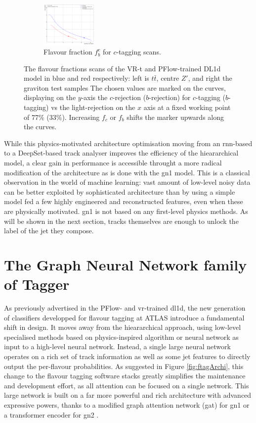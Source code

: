 \begin{figure}[h!]
\begin{subfigure}[b]{0.98\textwidth}
    \includegraphics[width=0.3\textwidth]{Images/FTAG/VRDL1d/scansfraction/thesis_plot_frac_c/contour_fraction_graviton_2000.pdf}
    \caption{Flavour fraction $f_b^c$ for $c$-tagging scans.} 
    \label{fig:DL1dVRscanfc}
\end{subfigure}
  \caption{The flavour fractions scans of the VR-t and PFlow-trained DL1d model in blue and red respectively: left is $t\bar{t}$, centre $Z'$, and right the graviton test samples The chosen values are marked on the curves, displaying on the $y$-axis the $c$-rejection ($b$-rejection) for $c$-tagging ($b$-tagging) vs the light-rejection on the $x$ axis at a fixed working point of 77\% (33\%). Increasing $f_c$ or $f_b$ shifts the marker upwards along the curves. }
  \label{fig:DL1dVRscanf}
\end{figure} 

While this physics-motivated architecture optimisation moving from an \gls{rnn}-based to a DeepSet-based track analyser improves the efficiency of the hieararchical model, a clear gain in performance is accessible throught a more radical modification of the architecture as is done with the \gls{gn1} model. This is a classical observation in the world of machine learning: vast amount of low-level noisy data can be better exploited by sophisticated architecture than by using a simple model fed a few highly engineered and reconstructed features, even when these are physically motivated. \gls{gn1} is not based on any first-level physics methods. As will be shown in the next section, tracks themselves are enough to unlock the label of the jet they compose. 

\section{The Graph Neural Network family of Tagger}\label{chap:GN}
As previously advertised in the PFlow- and \gls{vr}-trained \gls{dl1d}, the new generation of classifiers developped for flavour tagging at ATLAS introduce a fundamental shift in design. It moves away from the hieararchical approach, using low-level specialised methods based on physics-inspired algorithm or neural network as input to a high-level neural network. Instead, a single large neural network operates on a rich set of track information as well as some jet features to directly output the per-flavour probabilities. As suggested in Figure \ref{fig:ftagArchi}, this change to the flavour tagging software stacks greatly simplifies the maintenance and development effort, as all attention can be focused on a single network. This large network is built on a far more powerful and rich architecture with advanced expressive powers, thanks to a modified graph attention network (\gls{gat}) \cite{velickovic2018graph, brody2022how} for \gls{gn1} or a transformer encoder for \gls{gn2} \cite{NIPS_transformerPaper}. 

